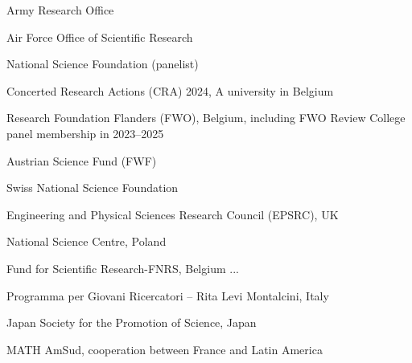 \documentclass[11pt,letter]{article}
\renewenvironment{itemize}{
  \begin{list}{}{
    \setlength{\leftmargin}{1.5em}
    \setlength{\itemsep}{0.25em}
    \setlength{\parskip}{0pt}
    \setlength{\parsep}{0.25em}
  }
}{
  \end{list}
}
\begin{document}
\begin{itemize}

\item Army Research Office
%
%
%
%
\item Air Force Office of Scientific Research
%
\item National Science Foundation (panelist)
%
%

\item Concerted Research Actions (CRA) 2024,
A university in Belgium

\item Research Foundation Flanders (FWO), Belgium, including FWO Review College panel membership in 2023--2025

\item Austrian Science Fund (FWF)

\item Swiss National Science Foundation

\item Engineering and Physical Sciences Research Council (EPSRC), UK

\item National Science Centre, Poland

\item Fund for Scientific Research-FNRS, Belgium
...

\item Programma per Giovani Ricercatori -- Rita Levi Montalcini, Italy

\item Japan Society for the Promotion of Science, Japan

\item MATH AmSud, cooperation between France and Latin America

\end{itemize}
\end{document}

